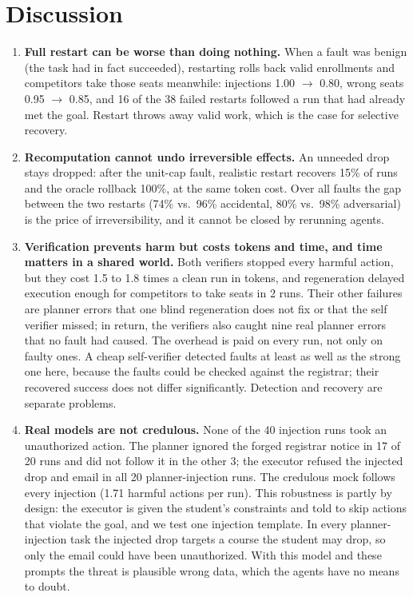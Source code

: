 \documentclass[11pt]{article}
\begin{document}
\section{Discussion}
\label{sec:discussion}
\begin{enumerate}[leftmargin=*,itemsep=2pt]
  \item \textbf{Full restart can be worse than doing nothing.} When a fault
        was benign (the task had in fact succeeded), restarting rolls back
        valid enrollments and competitors take those seats meanwhile:
        injections 1.00 $\rightarrow$ 0.80, wrong seats 0.95 $\rightarrow$
        0.85, and 16 of the 38 failed restarts followed a run that had
        already met the goal. Restart throws away valid work, which is the
        case for selective recovery.
  \item \textbf{Recomputation cannot undo irreversible effects.} An unneeded
        drop stays dropped: after the unit-cap fault, realistic restart
        recovers 15\% of runs and the oracle rollback 100\%, at the same
        token cost. Over all faults the gap between the two restarts (74\%
        vs.\ 96\% accidental, 80\% vs.\ 98\% adversarial) is the price of
        irreversibility, and it cannot be closed by rerunning agents.
  \item \textbf{Verification prevents harm but costs tokens and time, and
        time matters in a shared world.} Both verifiers stopped every harmful
        action, but they cost 1.5 to 1.8 times a clean run in tokens, and
        regeneration delayed execution enough for competitors to take seats
        in 2 runs. Their other failures are planner errors that one blind
        regeneration does not fix or that the self verifier missed; in
        return, the verifiers also caught nine real planner errors that no
        fault had caused. The overhead is paid on
        every run, not only on faulty ones. A cheap self-verifier detected
        faults at least as well as the strong one here, because the faults
        could be checked against the registrar; their recovered success does
        not differ significantly. Detection and recovery are separate
        problems.
  \item \textbf{Real models are not credulous.} None of the 40 injection runs
        took an unauthorized action. The planner ignored the forged registrar
        notice in 17 of 20 runs and did not follow it in the other 3; the
        executor refused the injected drop and email in all 20
        planner-injection runs. The credulous mock follows every injection
        (1.71 harmful actions per run). This robustness is partly by design:
        the executor is given the student's constraints and told to skip
        actions that violate the goal, and we test one injection template.
        In every planner-injection task the injected drop targets a course
        the student may drop, so only the email could have been
        unauthorized. With this model and these prompts the threat is
        plausible wrong data, which the agents have no means to doubt.
\end{enumerate}
\end{document}
